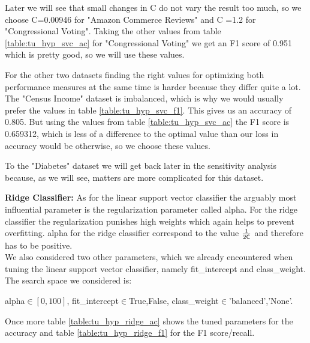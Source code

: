 \documentclass[a4paper,10pt]{article}
\begin{document}
Later we will see that small changes in \textsf{C} do not vary the result too much, so we choose \textsf{C}=0.00946 for "Amazon Commerce Reviews" and \textsf{C} =1.2 for "Congressional Voting". Taking the other values from table \ref{table:tu_hyp_svc_ac} for "Congressional Voting" we get an F1 score of 0.951 which is pretty good, so we will use these values.

For the other two datasets finding the right values for optimizing both performance measures at the same time is harder because they differ quite a lot. The "Census Income" dataset is imbalanced, which is why we would usually prefer the values in table \ref{table:tu_hyp_svc_f1}. This gives us an accuracy of 0.805. But using the values from table \ref{table:tu_hyp_svc_ac} the F1 score is 0.659312, which is less of a difference to the optimal value than our loss in accuracy would be otherwise, so we choose these values.

To the "Diabetes" dataset we will get back later in the sensitivity analysis because, as we will see, matters are more complicated for this dataset.

\textbf{Ridge Classifier:}
As for the linear support vector classifier the arguably most influential parameter is the regularization parameter called \textsf{alpha}. For the ridge classifier the regularization punishes high weights which again helps to prevent overfitting. \textsf{alpha} for the ridge classifier correspond to the value \(\frac{1}{2 \text{\textsf{C}}}\) and therefore has to be positive.\\
We also considered two other parameters, which we already encountered when tuning the linear support vector classifier, namely \textsf{fit\_intercept} and \textsf{class\_weight}. The search space we considered is:
\begin{center}
    \textsf{alpha}\(\in[0,100]\), \textsf{fit\_intercept}\(\in\){True,False}, \textsf{class\_weight}\(\in\){'balanced','None'}.
\end{center}

Once more table \ref{table:tu_hyp_ridge_ac} shows the tuned parameters for the accuracy and table \ref{table:tu_hyp_ridge_f1} for the F1 score/recall.
\end{document}
